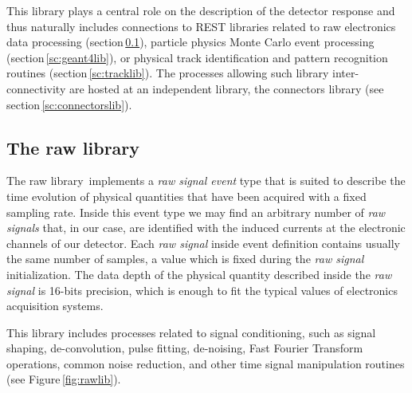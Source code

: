 This library plays a central role on the description of the detector response and thus naturally includes connections to REST libraries related to raw electronics data processing (section\,\ref{sc:rawlib}), particle physics Monte Carlo event processing (section\,\ref{sc:geant4lib}), or physical track identification and pattern recognition routines (section\,\ref{sc:tracklib}). The processes allowing such library inter-connectivity are hosted at an independent library, the connectors library (see section\,\ref{sc:connectorslib}).

\subsection{The raw library}\label{sc:rawlib}

The raw library\,\cite{REST_Raw_Git} implements a \emph{raw signal event} type that is suited to describe the time evolution of physical quantities that have been acquired with a fixed sampling rate. Inside this event type we may find an arbitrary number of \emph{raw signals} that, in our case, are identified with the induced currents at the electronic channels of our detector. Each \emph{raw signal} inside event definition contains usually the same number of samples, a value which is fixed during the \emph{raw signal} initialization. The data depth of the physical quantity described inside the \emph{raw signal} is 16-bits precision, which is enough to fit the typical values of electronics acquisition systems.

This library includes processes related to signal conditioning, such as signal shaping, de-convolution, pulse fitting, de-noising, Fast Fourier Transform operations, common noise reduction, and other time signal manipulation routines (see Figure\,\ref{fig:rawlib}). 

